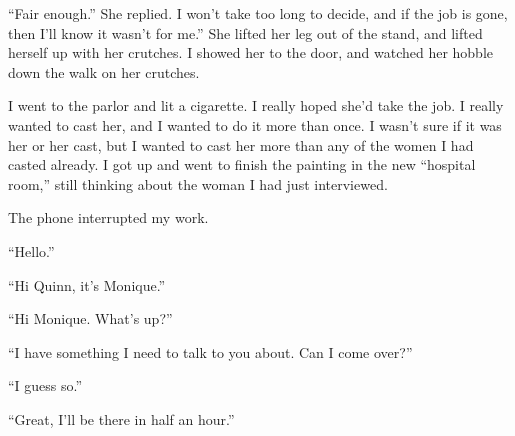 ``Fair enough.'' She replied. I won't take too long to decide, and if the job is gone, then
I'll know it wasn't for me.'' She lifted her leg out of the stand, and lifted herself up with
her crutches. I showed her to the door, and watched her hobble down the walk on her crutches.

I went to the parlor and lit a cigarette. I really hoped she'd take the job. I really wanted
to cast her, and I wanted to do it more than once. I wasn't sure if it was her or her cast, but
I wanted to cast her more than any of the women I had casted already. I got up and went to
finish the painting in the new ``hospital room,'' still thinking about the woman I had just
interviewed.

The phone interrupted my work.

``Hello.''

``Hi Quinn, it's Monique.''

``Hi Monique. What's up?''

``I have something I need to talk to you about. Can I come over?''

``I guess so.''

``Great, I'll be there in half an hour.''
